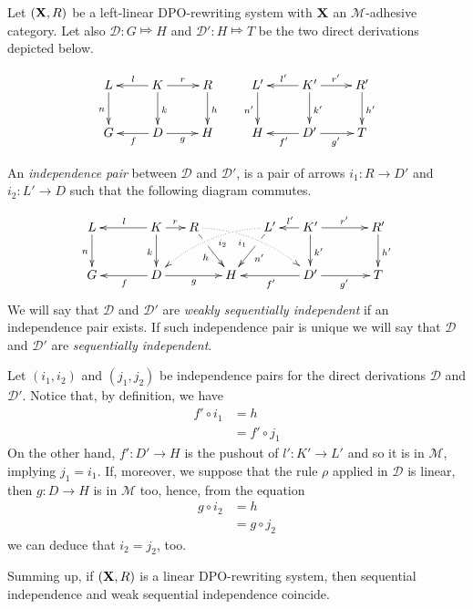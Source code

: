 \documentclass[a4paper,UKenglish,cleveref,pdftex, thm-restate,numberwithinsect]{lipics}
\def\R{\mathsf{R}}
\def\X{\textbf {\textup{X}}}
\newcommand{\dder}[1]{\mathscr{#1}}
\begin{document}
\begin{definition}  Let $(\X, \R)$ be a left-linear DPO-rewriting system with $\X$ an $\mathcal{M}$-adhesive category. Let also $\dder{D}\colon G\Mapsto H$ and $\dder{D'}\colon H\Mapsto T$ be the two direct derivations depicted below.
	
	\[\xymatrix{L \ar[d]_{n}& K \ar[d]^{k}\ar[l]_{l} \ar[r]^{r} & R \ar[d]^{h} & L' \ar[d]_{n'}& K' \ar[d]^{k'}\ar[l]_{l'} \ar[r]^{r'} & R' \ar[d]^{h'}\\G & \ar[l]^{f} D \ar[r]_{g}& H & H & \ar[l]^{f'} D' \ar[r]_{g'}& T}\]
	
	An \emph{independence pair} between $\dder{D}$ and $\dder{D'}$, is a pair of  arrows $i_1\colon R\to D'$ and $i_2\colon L'\to D$ such that the following diagram commutes.
	
	\[\xymatrix@C=15pt{L \ar[d]_{n}&& K \ar[d]_{k}\ar[ll]_{l} \ar[r]^{r} & R \ar@/^.35cm/@{.>}[drrr]|(.3)\hole_(.4){i_1} \ar[dr]|(.3)\hole_{h} && L' \ar@/_.35cm/@{.>}[dlll]^(.4){i_2} \ar[dl]|(.3)\hole^{n'}& K' \ar[d]^{k'}\ar[l]_{l'} \ar[rr]^{r'} && R' \ar[d]^{h'}\\G && \ar[ll]^{f} D \ar[rr]_{g}&& H  && \ar[ll]^{f'} D' \ar[rr]_{g'}&& T}\]
	We will say that $\dder{D}$ and $\dder{D'}$ are \emph{weakly sequentially independent} if an independence pair exists. If such independence pair is unique we will say that $\dder{D}$ and $\dder{D'}$ are \emph{sequentially independent}.
\end{definition}

\begin{example}
\end{example}
\begin{example}
\end{example}

\begin{remark}\label{rem:weak} Let $(i_1, i_2)$ and $(j_1, j_2)$ be independence pairs for the direct derivations $\dder{D}$ and $\dder{D'}$. Notice that, by definition, we have
	\begin{align*}f'\circ i_1&=h\\&=f'\circ j_1
	\end{align*}
	On the other hand, 
	$f'\colon D'\to H$ is  the pushout of $l'\colon K'\to L'$ and so it is in $\mathcal{M}$, implying $j_1=i_1$. If, moreover, we suppose that the rule $\rho$ applied in $\dder{D}$ is linear, then $g\colon D\to H$ is in $\mathcal{M}$ too, hence, from the equation
	\begin{align*}
		g\circ i_2&=h \\&= g\circ j_2
	\end{align*}
	we can deduce that $i_2=j_2$, too.
	
	Summing up, if $(\X, \R)$ is a linear DPO-rewriting system, then sequential independence and weak sequential independence coincide. 
\end{remark}
\end{document}
